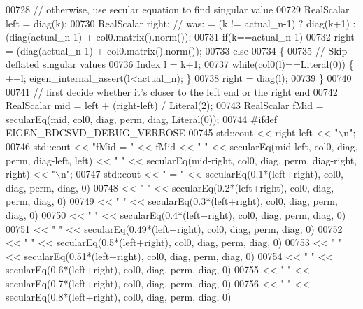 \begin{DoxyCode}
00728     \textcolor{comment}{// otherwise, use secular equation to find singular value}
00729     RealScalar left = diag(k);
00730     RealScalar right; \textcolor{comment}{// was: = (k != actual\_n-1) ? diag(k+1) : (diag(actual\_n-1) + col0.matrix().norm());}
00731     \textcolor{keywordflow}{if}(k==actual\_n-1)
00732       right = (diag(actual\_n-1) + col0.matrix().norm());
00733     \textcolor{keywordflow}{else}
00734     \{
00735       \textcolor{comment}{// Skip deflated singular values}
00736       \hyperlink{namespace_eigen_a62e77e0933482dafde8fe197d9a2cfde}{Index} l = k+1;
00737       \textcolor{keywordflow}{while}(col0(l)==Literal(0)) \{ ++l; eigen\_internal\_assert(l<actual\_n); \}
00738       right = diag(l);
00739     \}
00740 
00741     \textcolor{comment}{// first decide whether it's closer to the left end or the right end}
00742     RealScalar mid = left + (right-left) / Literal(2);
00743     RealScalar fMid = secularEq(mid, col0, diag, perm, diag, Literal(0));
00744 \textcolor{preprocessor}{#ifdef EIGEN\_BDCSVD\_DEBUG\_VERBOSE}
00745     std::cout << right-left << \textcolor{stringliteral}{"\(\backslash\)n"};
00746     std::cout << \textcolor{stringliteral}{"fMid = "} << fMid << \textcolor{stringliteral}{" "} << secularEq(mid-left, col0, diag, perm, diag-left, left) << \textcolor{stringliteral}{" "} 
      << secularEq(mid-right, col0, diag, perm, diag-right, right)   << \textcolor{stringliteral}{"\(\backslash\)n"};
00747     std::cout << \textcolor{stringliteral}{"     = "} << secularEq(0.1*(left+right), col0, diag, perm, diag, 0)
00748               << \textcolor{stringliteral}{" "}       << secularEq(0.2*(left+right), col0, diag, perm, diag, 0)
00749               << \textcolor{stringliteral}{" "}       << secularEq(0.3*(left+right), col0, diag, perm, diag, 0)
00750               << \textcolor{stringliteral}{" "}       << secularEq(0.4*(left+right), col0, diag, perm, diag, 0)
00751               << \textcolor{stringliteral}{" "}       << secularEq(0.49*(left+right), col0, diag, perm, diag, 0)
00752               << \textcolor{stringliteral}{" "}       << secularEq(0.5*(left+right), col0, diag, perm, diag, 0)
00753               << \textcolor{stringliteral}{" "}       << secularEq(0.51*(left+right), col0, diag, perm, diag, 0)
00754               << \textcolor{stringliteral}{" "}       << secularEq(0.6*(left+right), col0, diag, perm, diag, 0)
00755               << \textcolor{stringliteral}{" "}       << secularEq(0.7*(left+right), col0, diag, perm, diag, 0)
00756               << \textcolor{stringliteral}{" "}       << secularEq(0.8*(left+right), col0, diag, perm, diag, 0)

\end{DoxyCode}

